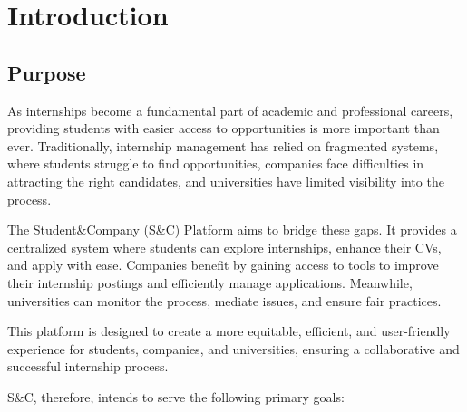 \chapter{Introduction}

\section{Purpose}
As internships become a fundamental part of academic and professional careers, providing students with easier access to opportunities is more important than ever. Traditionally, internship management has relied on fragmented systems, where students struggle to find opportunities, companies face difficulties in attracting the right candidates, and universities have limited visibility into the process.

The Student\&Company (S\&C) Platform aims to bridge these gaps. It provides a centralized system where students can explore internships, enhance their CVs, and apply with ease. Companies benefit by gaining access to tools to improve their internship postings and efficiently manage applications. Meanwhile, universities can monitor the process, mediate issues, and ensure fair practices.

This platform is designed to create a more equitable, efficient, and user-friendly experience for students, companies, and universities, ensuring a collaborative and successful internship process.

S\&C, therefore, intends to serve the following primary goals:

